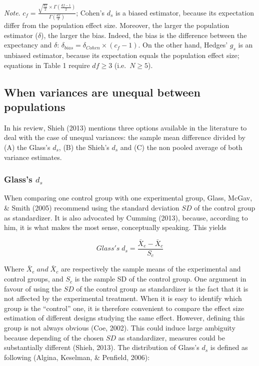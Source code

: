 \documentclass[
  man,floatsintext]{apa6}
\begin{document}
\begin{landscape}
\emph{Note}. \(c_f=\frac{\sqrt{\frac{df}{2}} \times \Gamma\left( \frac{df-1}{2}\right)}{\Gamma\left( \frac{df}{2}\right)}\); Cohen's \(d_s\) is a biased estimator, because its expectation differ from the population effect size. Moreover, the larger the population estimator (\(\delta\)), the larger the bias. Indeed, the bias is the difference between the expectancy and \(\delta\): \(\delta_{bias} = \delta_{Cohen} \times (c_f-1)\). On the other hand, Hedges' \(g_s\) is an unbiased estimator, because its expectation equals the population effect size; equations in Table 1 require \(df \ge 3\) (i.e.~\(N \ge 5\)).

\end{landscape}

\hypertarget{when-variances-are-unequal-between-populations}{%
\subsection{When variances are unequal between populations}\label{when-variances-are-unequal-between-populations}}

In his review, Shieh (2013) mentions three options available in the literature to deal with the case of unequal variances: the sample mean difference divided by (A) the Glass's \(d_s\), (B) the Shieh's \(d_s\) and (C) the non pooled average of both variance estimates.

\hypertarget{glasss-d_s}{%
\subsubsection{\texorpdfstring{Glass's \(d_s\)}{Glass's d\_s}}\label{glasss-d_s}}

When comparing one control group with one experimental group, Glass, McGav, \& Smith (2005) recommend using the standard deviation \(SD\) of the control group as standardizer. It is also advocated by Cumming (2013), because, according to him, it is what makes the most sense, conceptually speaking. This yields

\begin{equation} 
Glass's \; d_s = \frac{\bar{X}_{e} - \bar{X}_{c}}{S_{c}}
\label{eq:Glassds}
\end{equation}

Where \(\bar{X}_{e} \; and \; \bar{X}_{c}\) are respectively the sample means of the experimental and control groups, and \(S_{c}\) is the sample SD of the control group. One argument in favour of using the \(SD\) of the control group as standardizer is the fact that it is not affected by the experimental treatment. When it is easy to identify which group is the \enquote{control} one, it is therefore convenient to compare the effect size estimation of different designs studying the same effect. However, defining this group is not always obvious (Coe, 2002). This could induce large ambiguity because depending of the chosen \(SD\) as standardizer, measures could be substantially diﬀerent (Shieh, 2013). The distribution of Glass's \(d_{s}\) is defined as following (Algina, Keselman, \& Penfield, 2006):
\end{document}
